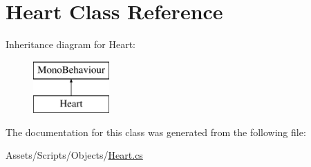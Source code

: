\hypertarget{class_heart}{}\section{Heart Class Reference}
\label{class_heart}
Inheritance diagram for Heart\+:\begin{figure}[H]
\begin{center}
\leavevmode
\includegraphics[height=2.000000cm]{class_heart}
\end{center}
\end{figure}


The documentation for this class was generated from the following file\+:\begin{DoxyCompactItemize}
\item 
Assets/\+Scripts/\+Objects/\mbox{\hyperlink{_heart_8cs}{Heart.\+cs}}\end{DoxyCompactItemize}
